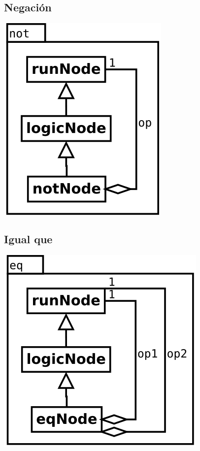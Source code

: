 \subsection {Negación}
\begin{center}
\includegraphics[scale=0.4]{not.png} \\
\end{center}


\subsection {Igual que}
\begin{center}
\includegraphics[scale=0.4]{eq.png} \\
\end{center}

